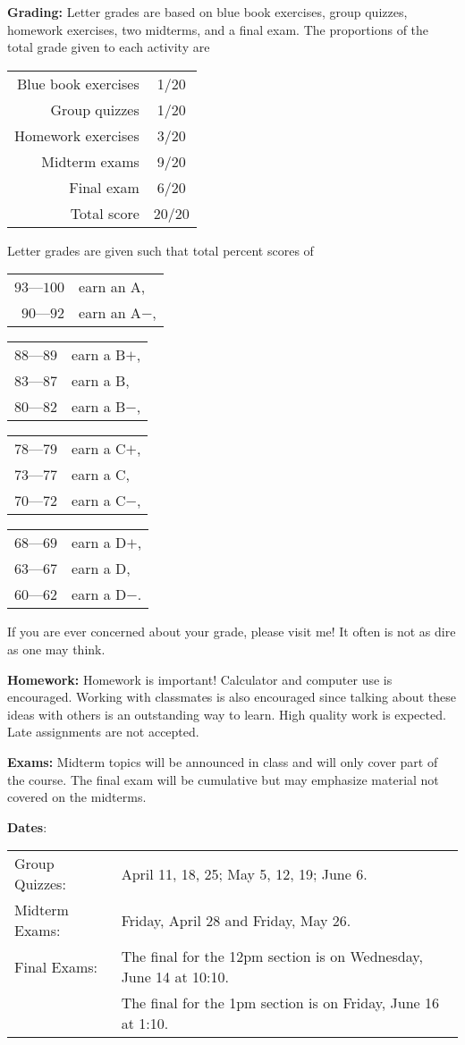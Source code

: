 \documentclass[11pt]{article}
\begin{document}
\textbf{Grading:} 
Letter grades are based on blue book exercises, group quizzes, homework exercises, two
midterms, and a final exam. The proportions of the total grade given to each activity are
\begin{center}
\begin{tabular}{r c}
Blue book exercises & 1/20 \\
Group quizzes & 1/20 \\
Homework exercises & 3/20 \\
Midterm exams & 9/20 \\
Final exam & 6/20 \\
\hline
Total score &  20/20
\end{tabular}
\end{center}
Letter grades are given such that total percent scores of
\begin{center}
\begin{tabular}[b]{rl}
  $93$---$100$ & earn an A, \\
  $90$---$92$ & earn an A$-$,
\end{tabular}
\begin{tabular}{ll} 
$88$---$89$ & earn a B$+$, \\
$83$---$87$ & earn a B, \\
$80$---$82$ & earn a B$-$,  
\end{tabular}
\begin{tabular}{ll} 
$78$---$79$ & earn a C$+$, \\
$73$---$77$ & earn a C, \\
$70$---$72$ & earn a C$-$,  
\end{tabular}
\begin{tabular}{ll}
$68$---$69$ & earn a D$+$, \\
$63$---$67$ & earn a D, \\
$60$---$62$ & earn a D$-$.
\end{tabular}
\end{center}
If you are ever concerned about your grade, please visit me!  It often is not 
as dire as one may think.

\textbf{Homework:} 
Homework is important!  
Calculator and computer use is encouraged.  Working with 
classmates is also encouraged since talking about these ideas with others 
is an outstanding way to learn.  High quality work is expected.  Late assignments are
not accepted.  

\textbf{Exams:} Midterm topics will be announced in class and will 
only cover part of the course.  The final exam will be cumulative but may 
emphasize material not covered on the midterms.

\textbf{Dates}:
\begin{tabular}[t]{ll}
  Group Quizzes: & April 11, 18, 25; May 5, 12, 19; June 6. \\
  Midterm Exams: & Friday, April 28 and Friday, May 26. \\
  Final Exams: & The final for the 12pm section is on Wednesday, June 14 at 10:10. \\
  & The final for the 1pm section is on Friday, June 16 at 1:10. 
\end{tabular}
\end{document}
